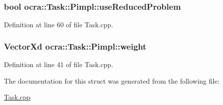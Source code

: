 \subsubsection[{\texorpdfstring{use\+Reduced\+Problem}{useReducedProblem}}]{\setlength{\rightskip}{0pt plus 5cm}bool ocra\+::\+Task\+::\+Pimpl\+::use\+Reduced\+Problem}\hypertarget{structocra_1_1Task_1_1Pimpl_a3212017ae655edc8559498c773f0285f}{}\label{structocra_1_1Task_1_1Pimpl_a3212017ae655edc8559498c773f0285f}


Definition at line 60 of file Task.\+cpp.

\subsubsection[{\texorpdfstring{weight}{weight}}]{\setlength{\rightskip}{0pt plus 5cm}Vector\+Xd ocra\+::\+Task\+::\+Pimpl\+::weight}\hypertarget{structocra_1_1Task_1_1Pimpl_ab2c51ef740079f8fae0f8e3de1b20d08}{}\label{structocra_1_1Task_1_1Pimpl_ab2c51ef740079f8fae0f8e3de1b20d08}


Definition at line 41 of file Task.\+cpp.



The documentation for this struct was generated from the following file\+:\begin{DoxyCompactItemize}
\item 
\hyperlink{Task_8cpp}{Task.\+cpp}\end{DoxyCompactItemize}
